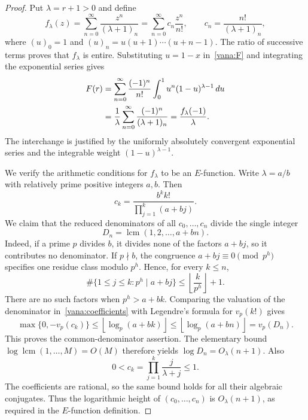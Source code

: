 \begin{proof}
Put $\lambda=r+1>0$ and define
\begin{equation}\label{vana:f}
 f_\lambda(z)=\sum_{n=0}^\infty\frac{z^n}{(\lambda+1)_n}
             =\sum_{n=0}^\infty c_n\frac{z^n}{n!},
 \qquad c_n=\frac{n!}{(\lambda+1)_n},
\end{equation}
where $(u)_0=1$ and $(u)_n=u(u+1)\cdots(u+n-1)$.
The ratio of successive terms proves that $f_\lambda$ is entire.
Substituting $u=1-x$ in~\eqref{vana:F} and integrating the exponential
series gives
\begin{align}
 F(r)
 &=\sum_{n=0}^\infty\frac{(-1)^n}{n!}
      \int_0^1u^n(1-u)^{\lambda-1}\,du\notag\\
 &=\frac1\lambda
      \sum_{n=0}^\infty\frac{(-1)^n}{(\lambda+1)_n}
  =\frac{f_\lambda(-1)}{\lambda}.
 \label{vana:beta-identity}
\end{align}
The interchange is justified by the uniformly absolutely convergent
exponential series and the integrable weight
$(1-u)^{\lambda-1}$.

We verify the arithmetic conditions for $f_\lambda$ to be an
$E$-function.  Write $\lambda=a/b$ with relatively prime positive
integers $a,b$.  Then
\begin{equation}\label{vana:coefficients}
 c_k=\frac{b^k k!}{\prod_{j=1}^k(a+bj)}.
\end{equation}
We claim that the reduced denominators of all $c_0,\ldots,c_n$ divide
the single integer
\begin{equation}\label{vana:denominator}
 D_n=\operatorname{lcm}(1,2,\ldots,a+bn).
\end{equation}
Indeed, if a prime $p$ divides $b$, it divides none of the factors
$a+bj$, so it contributes no denominator.  If $p\nmid b$, the
congruence $a+bj\equiv0\pmod{p^h}$ specifies one residue class
modulo $p^h$.  Hence, for every $k\le n$,
\[
 \#\{1\le j\le k:p^h\mid a+bj\}
 \le \left\lfloor\frac{k}{p^h}\right\rfloor+1.
\]
There are no such factors when $p^h>a+bk$.  Comparing the valuation
of the denominator in~\eqref{vana:coefficients} with Legendre's
formula for $v_p(k!)$ gives
\[
 \max\{0,-v_p(c_k)\}
 \le \left\lfloor\log_p(a+bk)\right\rfloor
 \le \left\lfloor\log_p(a+bn)\right\rfloor
 =v_p(D_n).
\]
This proves the common-denominator assertion.
The elementary bound
$\log\operatorname{lcm}(1,\ldots,M)=O(M)$ therefore yields
$\log D_n=O_\lambda(n+1)$.  Also
\[
 0<c_k=\prod_{j=1}^k\frac{j}{\lambda+j}\le1.
\]
The coefficients are rational, so the same bound holds for all their
algebraic conjugates.  Thus the logarithmic height of
$(c_0,\ldots,c_n)$ is $O_\lambda(n+1)$, as required in the
$E$-function definition.


\end{proof}
